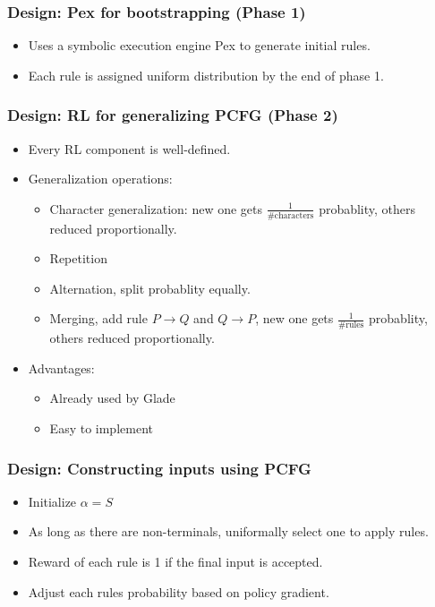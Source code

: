 \begin{frame}
	\frametitle{Design: Pex for bootstrapping (Phase 1)}
	\begin{itemize}
		\item Uses a symbolic execution engine Pex to generate initial rules.
		\item Each rule is assigned uniform distribution by the end of phase 1.
	\end{itemize}
\end{frame}
\begin{frame}
	\frametitle{Design: RL for generalizing PCFG (Phase 2)}
	\begin{itemize}
		\item Every RL component is well-defined.
		\item Generalization operations:
		      \begin{itemize}
			      \item Character generalization: new one gets $\frac{1}{\text{\# characters}}$ probablity, others reduced proportionally.
			      \item Repetition
			      \item Alternation, split probablity equally.
			      \item Merging, add rule $P \rightarrow Q$ and $Q \rightarrow P$, new one gets $\frac{1}{\text{\# rules}}$ probablity, others reduced proportionally.
		      \end{itemize}
		\item Advantages:
		      \begin{itemize}
			      \item Already used by Glade
			      \item Easy to implement
		      \end{itemize}
	\end{itemize}
\end{frame}
\begin{frame}
	\frametitle{Design: Constructing inputs using PCFG}
	\begin{itemize}
		\item Initialize $\alpha = S$
		\item As long as there are non-terminals, uniformally select one to apply rules.
		\item Reward of each rule is 1 if the final input is accepted.
		\item Adjust each rules probability based on policy gradient.
	\end{itemize}
\end{frame}


